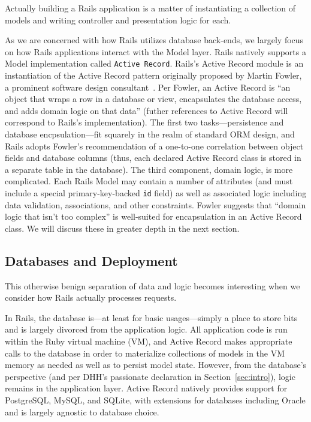 Actually building a Rails application is a matter of instantiating a collection of models and writing controller and presentation logic for each.

As we are concerned with how Rails utilizes database back-ends, we largely focus on how Rails applications interact with the Model layer. Rails natively supports a Model implementation called \texttt{Active Record}. Rails's Active Record module is an instantiation of the Active Record pattern originally proposed by Martin Fowler, a prominent software design consultant~\cite{fowler-book}. Per Fowler, an Active Record is ``an object that wraps a row in a database or view, encapsulates the database access, and adds domain logic on that data'' (futher references to Active Record will correspond to Rails's implementation). The first two tasks---persistence and database encpsulation---fit squarely in the realm of standard ORM design, and Rails adopts Fowler's recommendation of a one-to-one correlation between object fields and database columns (thus, each declared Active Record class is stored in a separate table in the database). The third component, domain logic, is more complicated. Each Rails Model may contain a number of attributes (and must include a special primary-key-backed \texttt{id} field) as well as associated logic including data validation, associations, and other constraints. Fowler suggests that ``domain logic that isn't too complex'' is well-suited for encapsulation in an Active Record class. We will discuss these in greater depth in the next section.

\subsection{Databases and Deployment}
\label{sec:deployment}

This otherwise benign separation of data and logic becomes interesting when we consider how Rails actually processes requests.

In Rails, the database is---at least for basic usages---simply a place to store bits and is largely divorced from the application logic. All application code is run within the Ruby virtual machine (VM), and Active Record makes appropriate calls to the database in order to materialize collections of models in the VM memory as needed as well as to persist model state. However, from the database's perspective (and per DHH's passionate declaration in Section~\ref{sec:intro}), logic remains in the application layer. Active Record natively provides support for PostgreSQL, MySQL, and SQLite, with extensions for databases including Oracle and is largely agnostic to database choice.

